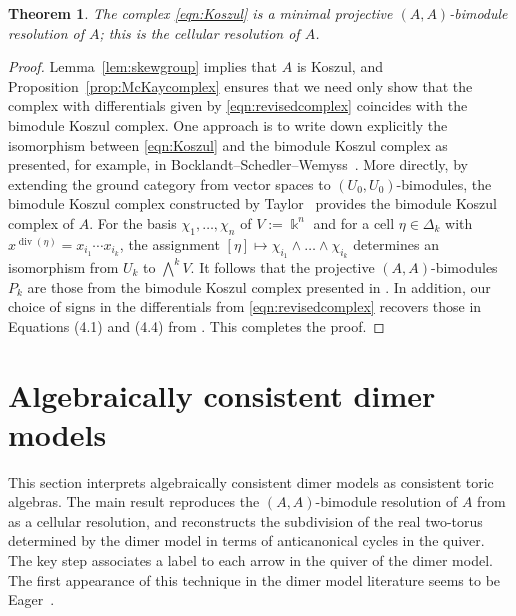 \documentclass[11pt,a4paper]{amsart}
\numberwithin{equation}{section}
\newtheorem{theorem}{Theorem}[section]
\theoremstyle{definition}
\theoremstyle{remark}
\newcommand{\kk}{\ensuremath{\Bbbk}}
\renewcommand{\div}{\operatorname{div}}
\begin{document}
\begin{theorem}
\label{thm:McKayresolution}
The complex \eqref{eqn:Koszul} is a minimal projective $(A,A)$-bimodule resolution of $A$; this is the \emph{cellular resolution} of $A$.
\end{theorem}
\begin{proof}
Lemma~\ref{lem:skewgroup} implies that $A$ is Koszul, and Proposition~\ref{prop:McKaycomplex} ensures that we need only show that the complex with differentials given by \eqref{eqn:revisedcomplex} coincides with the bimodule Koszul complex. One approach is to write down explicitly the isomorphism between \eqref{eqn:Koszul} and the bimodule Koszul complex as presented, for example,  in Bocklandt--Schedler--Wemyss~\cite[Lemma~6.1]{BSW}. More directly,  by extending the ground category from vector spaces to $(U_0,U_0)$-bimodules, the bimodule Koszul complex constructed by Taylor~\cite[Equation (4.4)]{Taylor} provides the bimodule Koszul complex of $A$. For the basis $\chi_1,\dots, \chi_n$ of $V:=\kk^n$ and for a cell $\eta \in \Delta_{k}$ with $x^{\div(\eta)}=x_{i_1}\cdots x_{i_k}$, the assignment  $[\eta] \mapsto \chi_{i_1}\wedge \dots \wedge \chi_{i_k}$ determines an isomorphism from $U_k$ to $\bigwedge^k V$. It follows that the projective $(A,A)$-bimodules $P_k$ are those from the bimodule Koszul complex presented in \cite[Equation (4.4)]{Taylor}. In addition, our choice of signs in the differentials from \eqref{eqn:revisedcomplex} recovers those in Equations (4.1) and (4.4) from \cite{Taylor}. This completes the proof.
\end{proof}




  \section{Algebraically consistent dimer models}
  \label{sec:dimers}
 This section interprets algebraically consistent dimer models as consistent toric algebras.  The main result reproduces the $(A,A)$-bimodule resolution of $A$ from \cite{Broomhead, Davison, MozgovoyReineke} as a cellular resolution, and reconstructs the subdivision of the real two-torus determined by the dimer model in terms of anticanonical cycles in the quiver. The key step associates a label to each arrow in the quiver of the dimer model. The first appearance of this technique in the dimer model literature seems to be Eager~\cite[\S6]{Eager}.

      
\end{document}

